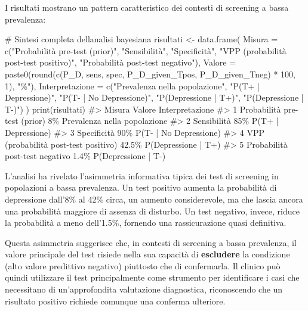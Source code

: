 \documentclass[
  letterpaper,
  DIV=11,
  numbers=noendperiod,
  oneside]{scrreprt}
\newenvironment{Shaded}{\begin{snugshade}}{\end{snugshade}}
\newcommand{\AttributeTok}[1]{\textcolor[rgb]{0.40,0.45,0.13}{#1}}
\newcommand{\CommentTok}[1]{\textcolor[rgb]{0.37,0.37,0.37}{#1}}
\newcommand{\DecValTok}[1]{\textcolor[rgb]{0.68,0.00,0.00}{#1}}
\newcommand{\FunctionTok}[1]{\textcolor[rgb]{0.28,0.35,0.67}{#1}}
\newcommand{\NormalTok}[1]{\textcolor[rgb]{0.00,0.23,0.31}{#1}}
\newcommand{\OtherTok}[1]{\textcolor[rgb]{0.00,0.23,0.31}{#1}}
\newcommand{\SpecialCharTok}[1]{\textcolor[rgb]{0.37,0.37,0.37}{#1}}
\newcommand{\StringTok}[1]{\textcolor[rgb]{0.13,0.47,0.30}{#1}}
\theoremstyle{definition}
\theoremstyle{plain}
\theoremstyle{definition}
\theoremstyle{remark}
\begin{document}
\begin{tcolorbox}
I risultati mostrano un pattern caratteristico dei contesti di screening
a bassa prevalenza:

\begin{Shaded}
\begin{Highlighting}[]
\CommentTok{\# Sintesi completa dell\textquotesingle{}analisi bayesiana}
\NormalTok{risultati }\OtherTok{\textless{}{-}} \FunctionTok{data.frame}\NormalTok{(}
  \AttributeTok{Misura =} \FunctionTok{c}\NormalTok{(}\StringTok{"Probabilità pre{-}test (prior)"}\NormalTok{, }
             \StringTok{"Sensibilità"}\NormalTok{, }
             \StringTok{"Specificità"}\NormalTok{,}
             \StringTok{"VPP (probabilità post{-}test positivo)"}\NormalTok{,}
             \StringTok{"Probabilità post{-}test negativo"}\NormalTok{),}
  \AttributeTok{Valore =} \FunctionTok{paste0}\NormalTok{(}\FunctionTok{round}\NormalTok{(}\FunctionTok{c}\NormalTok{(P\_D, sens, spec, P\_D\_given\_Tpos, P\_D\_given\_Tneg) }\SpecialCharTok{*} \DecValTok{100}\NormalTok{, }\DecValTok{1}\NormalTok{), }\StringTok{"\%"}\NormalTok{),}
  \AttributeTok{Interpretazione =} \FunctionTok{c}\NormalTok{(}\StringTok{"Prevalenza nella popolazione"}\NormalTok{,}
                     \StringTok{"P(T+ | Depressione)"}\NormalTok{,}
                     \StringTok{"P(T{-} | No Depressione)"}\NormalTok{, }
                     \StringTok{"P(Depressione | T+)"}\NormalTok{,}
                     \StringTok{"P(Depressione | T{-})"}\NormalTok{)}
\NormalTok{)}
\FunctionTok{print}\NormalTok{(risultati)}
\CommentTok{\#\textgreater{}                                 Misura Valore              Interpretazione}
\CommentTok{\#\textgreater{} 1         Probabilità pre{-}test (prior)     8\% Prevalenza nella popolazione}
\CommentTok{\#\textgreater{} 2                          Sensibilità    85\%          P(T+ | Depressione)}
\CommentTok{\#\textgreater{} 3                          Specificità    90\%       P(T{-} | No Depressione)}
\CommentTok{\#\textgreater{} 4 VPP (probabilità post{-}test positivo)  42.5\%          P(Depressione | T+)}
\CommentTok{\#\textgreater{} 5       Probabilità post{-}test negativo   1.4\%          P(Depressione | T{-})}
\end{Highlighting}
\end{Shaded}

L'analisi ha rivelato l'asimmetria informativa tipica dei test di
screening in popolazioni a bassa prevalenza. Un test positivo aumenta la
probabilità di depressione dall'8\% al 42\% circa, un aumento
considerevole, ma che lascia ancora una probabilità maggiore di assenza
di disturbo. Un test negativo, invece, riduce la probabilità a meno
dell'1.5\%, fornendo una rassicurazione quasi definitiva.

Questa asimmetria suggerisce che, in contesti di screening a bassa
prevalenza, il valore principale del test risiede nella sua capacità di
\textbf{escludere} la condizione (alto valore predittivo negativo)
piuttosto che di confermarla. Il clinico può quindi utilizzare il test
principalmente come strumento per identificare i casi che necessitano di
un'approfondita valutazione diagnostica, riconoscendo che un risultato
positivo richiede comunque una conferma ulteriore.

\end{tcolorbox}
\end{document}
